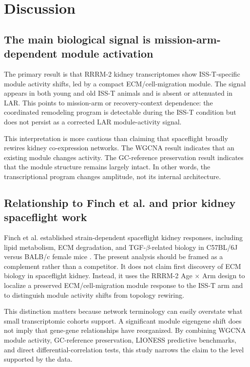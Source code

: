 \documentclass[11pt]{article}
\begin{document}
\section{Discussion}

\subsection{The main biological signal is mission-arm-dependent module activation}

The primary result is that RRRM-2 kidney transcriptomes show ISS-T-specific module activity shifts, led by a compact ECM/cell-migration module. The signal appears in both young and old ISS-T animals and is absent or attenuated in LAR. This points to mission-arm or recovery-context dependence: the coordinated remodeling program is detectable during the ISS-T condition but does not persist as a corrected LAR module-activity signal.

This interpretation is more cautious than claiming that spaceflight broadly rewires kidney co-expression networks. The WGCNA result indicates that an existing module changes activity. The GC-reference preservation result indicates that the module structure remains largely intact. In other words, the transcriptional program changes amplitude, not its internal architecture.

\subsection{Relationship to Finch et al. and prior kidney spaceflight work}

Finch et al. established strain-dependent spaceflight kidney responses, including lipid metabolism, ECM degradation, and TGF-$\beta$-related biology in C57BL/6J versus BALB/c female mice \citep{finch2025strain}. The present analysis should be framed as a complement rather than a competitor. It does not claim first discovery of ECM biology in spaceflight kidney. Instead, it uses the RRRM-2 Age $\times$ Arm design to localize a preserved ECM/cell-migration module response to the ISS-T arm and to distinguish module activity shifts from topology rewiring.

This distinction matters because network terminology can easily overstate what small transcriptomic cohorts support. A significant module eigengene shift does not imply that gene-gene relationships have reorganized. By combining WGCNA module activity, GC-reference preservation, LIONESS predictive benchmarks, and direct differential-correlation tests, this study narrows the claim to the level supported by the data.
\end{document}
